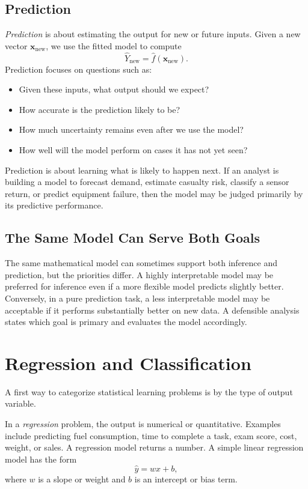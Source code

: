 \subsection{Prediction}

\emph{Prediction} is about estimating the output for new or future inputs.  Given a new vector $\mathbf{x}_{\text{new}}$, we use the fitted model to compute
\[
  \widehat{Y}_{\text{new}} = \hat{f}(\mathbf{x}_{\text{new}}).
\]
Prediction focuses on questions such as:
\begin{itemize}
  \item Given these inputs, what output should we expect?
  \item How accurate is the prediction likely to be?
  \item How much uncertainty remains even after we use the model?
  \item How well will the model perform on cases it has not yet seen?
\end{itemize}

Prediction is about learning what is likely to happen next.  If an analyst is building a model to forecast demand, estimate casualty risk, classify a sensor return, or predict equipment failure, then the model may be judged primarily by its predictive performance.

\subsection{The Same Model Can Serve Both Goals}

The same mathematical model can sometimes support both inference and prediction, but the priorities differ.  A highly interpretable model may be preferred for inference even if a more flexible model predicts slightly better.  Conversely, in a pure prediction task, a less interpretable model may be acceptable if it performs substantially better on new data.  A defensible analysis states which goal is primary and evaluates the model accordingly.

\section{Regression and Classification}

A first way to categorize statistical learning problems is by the type of output variable.

In a \emph{regression} problem, the output is numerical or quantitative.  Examples include predicting fuel consumption, time to complete a task, exam score, cost, weight, or sales.  A regression model returns a number.  A simple linear regression model has the form
\begin{equation}
  \widehat{y} = wx + b,
  \label{eq:linear-regression-first}
\end{equation}
where $w$ is a slope or weight and $b$ is an intercept or bias term.

